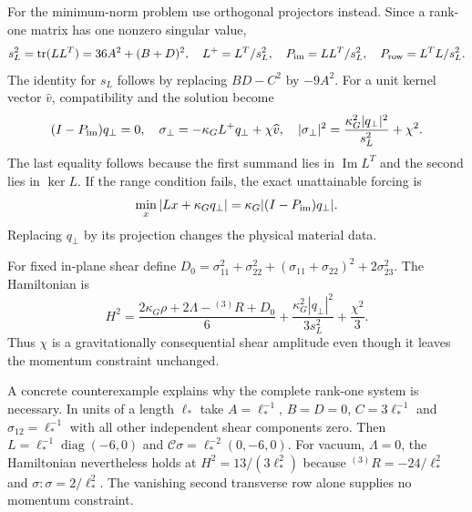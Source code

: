 For the minimum-norm problem use orthogonal projectors instead. Since a rank-one matrix has one nonzero singular value,
\begin{equation}
 s_L^2=\operatorname{tr}(LL^T)=36A^2+(B+D)^2,\quad
 L^+=L^T/s_L^2,\quad P_{\rm im}=LL^T/s_L^2,\quad
 P_{\rm row}=L^TL/s_L^2.
 \label{geo:orthogonal_projectors}
\end{equation}
The identity for $s_L$ follows by replacing $BD-C^2$ by $-9A^2$. For a unit kernel vector $\widehat v$, compatibility and the solution become
\begin{equation}
 (I-P_{\rm im})q_\perp=0,\quad
 \sigma_\perp=-\kappa_GL^+q_\perp+\chi\widehat v,\quad
 |\sigma_\perp|^2=\frac{\kappa_G^2|q_\perp|^2}{s_L^2}+\chi^2.
 \label{geo:exceptional_minimum}
\end{equation}
The last equality follows because the first summand lies in $\operatorname{Im}L^T$ and the second lies in $\ker L$. If the range condition fails, the exact unattainable forcing is
\begin{equation}
 \min_x|Lx+\kappa_Gq_\perp|
       =\kappa_G|(I-P_{\rm im})q_\perp|.
 \label{geo:exceptional_distance}
\end{equation}
Replacing $q_\perp$ by its projection changes the physical material data.

For fixed in-plane shear define
$D_0=\sigma_{11}^2+\sigma_{22}^2+(\sigma_{11}+\sigma_{22})^2+2\sigma_{23}^2$.
The Hamiltonian is
\begin{equation}
 H^2=\frac{2\kappa_G\rho+2\Lambda-{}^{(3)}R+D_0}{6}
       +\frac{\kappa_G^2|q_\perp|^2}{3s_L^2}+\frac{\chi^2}{3}.
 \label{geo:exceptional_budget}
\end{equation}
Thus $\chi$ is a gravitationally consequential shear amplitude even though it leaves the momentum constraint unchanged.

A concrete counterexample explains why the complete rank-one system is necessary. In units of a length $\ell_*$ take $A=\ell_*^{-1}$, $B=D=0$, $C=3\ell_*^{-1}$ and $\sigma_{12}=\ell_*^{-1}$ with all other independent shear components zero. Then $L=\ell_*^{-1}\operatorname{diag}(-6,0)$ and $\mathcal C\sigma=\ell_*^{-2}(0,-6,0)$. For vacuum, $\Lambda=0$, the Hamiltonian nevertheless holds at $H^2=13/(3\ell_*^2)$ because ${}^{(3)}R=-24/\ell_*^2$ and $\sigma:\sigma=2/\ell_*^2$. The vanishing second transverse row alone supplies no momentum constraint.

